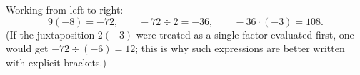 Working from left to right:
\[
9(-8)=-72,\qquad -72\div2=-36,\qquad -36\cdot(-3)=\boxed{108}.
\]
(If the juxtaposition $2(-3)$ were treated as a single factor evaluated first, one would get $-72\div(-6)=12$; this is why such expressions are better written with explicit brackets.)
